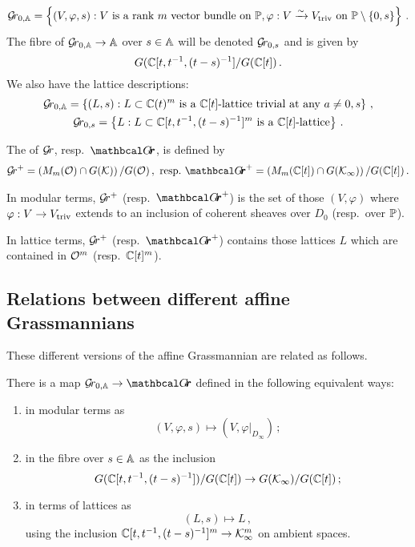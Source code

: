\documentclass{article}
\begin{document}
$$
\Grbd = 
    \left\{ 
        (V,\varphi,s) : V\text{ is a rank $m$ vector bundle on }\PP, \varphi : V \xrightarrow{\sim} \Vtriv \text{ on } \PP \setminus \{0, s\}  
    \right\}\,. 
$$
% 
The fibre of $\Grbd \to \AA$ over $ s \in \AA $ will be denoted $ \Gr_{0,s} $ and is given by
% 
$$ 
    G(\CC[t, t^{-1}, (t-s)^{-1}]/G(\CC[t])\,. %
$$
We also have the lattice descriptions:
% 
\begin{gather*}
\Grbd = 
    \left\{ 
        (L,s) : L \subset  \CC(t)^m\text{ is a $\CC[t]$-lattice trivial at any }a \ne 0, s 
    \right\}\,, \\
\Gr_{0,s} = 
    \left\{ 
        L : L \subset  \CC[t,t^{-1},(t-s)^{-1}]^m \text{ is a $\CC[t]$-lattice} 
    \right\}\,.
\end{gather*}
% 
\begin{definition} 
\label{def:grplus}
The  of $\Gr $, resp.\ $\Grth$, is defined by 
\begin{gather*}
    \Gr^+ = \left(M_m(\cO) \cap G(\cK)\right) / G(\cO)\,,\,\, 
    \text{resp.\ } {\Grth}^+ = \left(M_m(\CC[t]) \cap G(\Kinf)\right) / G(\CC[t])\,. 
\end{gather*}
\end{definition}
% 
In modular terms, $\Gr^+$ (resp.\ ${\Grth}^+$) is the set of those $ (V, \varphi)$ where $ \varphi : V \rightarrow \Vtriv $ extends to an inclusion of coherent sheaves over $ D_0 $ (resp.\ over $ \PP$).

In lattice terms, $ \Gr^+$ (resp.\ ${\Grth}^+$) contains those lattices $L$ which are contained in $\cO^m$ (resp.\ $\CC[t]^m$).
% 

\subsection{Relations between different affine Grassmannians}
\label{ss:relsbtwgrs}
% 
These different versions of the affine Grassmannian are related as follows.  
% 
\begin{proposition}
    \label{pr:bd-th}
    There is a map $\Grbd \rightarrow \Grth $ defined in the following equivalent ways:
    \begin{enumerate}
        \item in modular terms as $$(V,\varphi,s)\mapsto (V, \varphi \big|_{D_\infty}) \, ;$$
        \item in the fibre over $ s \in \AA$ as the inclusion $$
        G(\CC[t, t^{-1}, (t-s)^{-1}])/ G(\CC[t]) \rightarrow G(\Kinf)/G(\CC[t])\,;$$
        \item in terms of lattices as $$(L,s)\mapsto L\,,$$ using the inclusion $\CC[t, t^{-1}, (t-s)^{-1}]^m \rightarrow \Kinf^m$ on ambient spaces. 
    \end{enumerate}
\end{proposition}
% 
\end{document}
